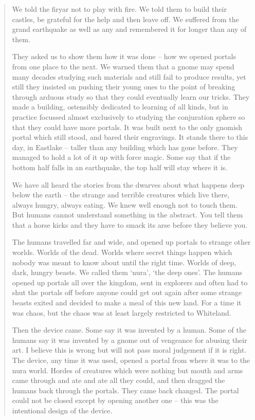 \begin{quotation}
	
We told the firyar not to play with fire.  We told them to build their castles, be grateful for the help and then leave off.  We suffered from the grand earthquake as well as any and remembered it for longer than any of them.  

	They asked us to show them how it was done -- how we opened portals from one place to the next.  We warned them that a gnome may spend many decades studying such materials and still fail to produce results, yet still they insisted on pushing their young ones to the point of breaking through arduous study so that they could eventually learn our tricks.  They made a building, ostensibly dedicated to learning of all kinds, but in practice focussed almost exclusively to studying the conjuration sphere so that they could have more portals.  It was built next to the only gnomish portal which still stood, and bared their engravings.  It stands there to this day, in Eastlake -- taller than any building which has gone before.  They managed to hold a lot of it up with force magic.  Some say that if the bottom half falls in an earthquake, the top half will stay where it is.

	We have all heard the stories from the dwarves about what happens deep below the earth -- the strange and terrible creatures which live there, always hungry, always eating.  We knew well enough not to touch them.  But humans cannot understand something in the abstract.  You tell them that a horse kicks and they have to smack its arse before they believe you.

	The humans travelled far and wide, and opened up portals to strange other worlds.  Worlds of the dead.  Worlds where secret things happen which nobody was meant to know about until the right time.  Worlds of deep, dark, hungry beasts.  We called them `nura', `the deep ones'.  The humans opened up portals all over the kingdom, sent in explorers and often had to shut the portals off before anyone could get out again after some strange beasts exited and decided to make a meal of this new land.  For a time it was chaos, but the chaos was at least largely restricted to Whiteland.

	Then the device came.  Some say it was invented by a human.  Some of the humans say it was invented by a gnome out of vengeance for abusing their art.  I believe this is wrong but will not pass moral judgement if it is right.  The device, any time it was used, opened a portal from where it was to the nura world.  Hordes of creatures which were nothing but mouth and arms came through and ate and ate all they could, and then dragged the humans back through the portals.  They came back changed.  The portal could not be closed except by opening another one -- this was the intentional design of the device.


\end{quotation}
